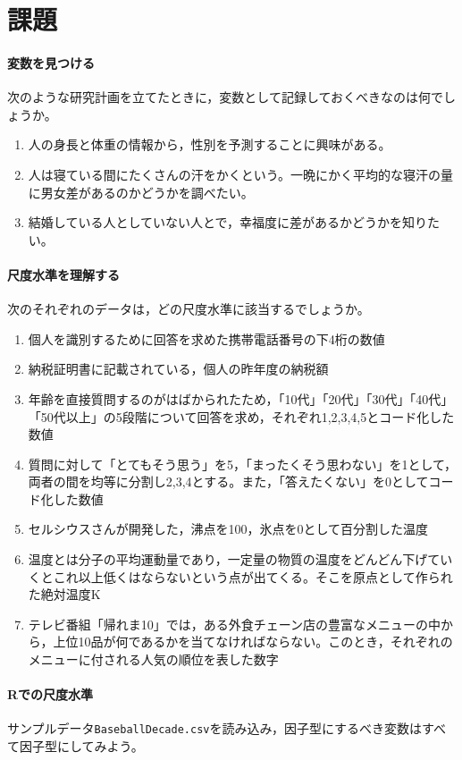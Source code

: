 \documentclass{ltjsbook}
\begin{document}
\section{課題}
\paragraph{変数を見つける}次のような研究計画を立てたときに，変数として記録しておくべきなのは何でしょうか。
\begin{enumerate}
	\item 人の身長と体重の情報から，性別を予測することに興味がある。
	\item 人は寝ている間にたくさんの汗をかくという。一晩にかく平均的な寝汗の量に男女差があるのかどうかを調べたい。
	\item 結婚している人としていない人とで，幸福度に差があるかどうかを知りたい。
\end{enumerate}

\paragraph{尺度水準を理解する}次のそれぞれのデータは，どの尺度水準に該当するでしょうか。
\begin{enumerate}
	\item 個人を識別するために回答を求めた携帯電話番号の下4桁の数値
	\item 納税証明書に記載されている，個人の昨年度の納税額
	\item 年齢を直接質問するのがはばかられたため，「10代」「20代」「30代」「40代」「50代以上」の5段階について回答を求め，それぞれ1,2,3,4,5とコード化した数値
	\item 質問に対して「とてもそう思う」を5，「まったくそう思わない」を1として，両者の間を均等に分割し2,3,4とする。また，「答えたくない」を0としてコード化した数値
	\item セルシウスさんが開発した，沸点を100，氷点を0として百分割した温度
	\item 温度とは分子の平均運動量であり，一定量の物質の温度をどんどん下げていくとこれ以上低くはならないという点が出てくる。そこを原点として作られた絶対温度K
	\item テレビ番組「帰れま10」では，ある外食チェーン店の豊富なメニューの中から，上位10品が何であるかを当てなければならない。このとき，それぞれのメニューに付される人気の順位を表した数字
\end{enumerate}

\paragraph{Rでの尺度水準}サンプルデータ\verb|BaseballDecade.csv|を読み込み，因子型にするべき変数はすべて因子型にしてみよう。
\end{document}
